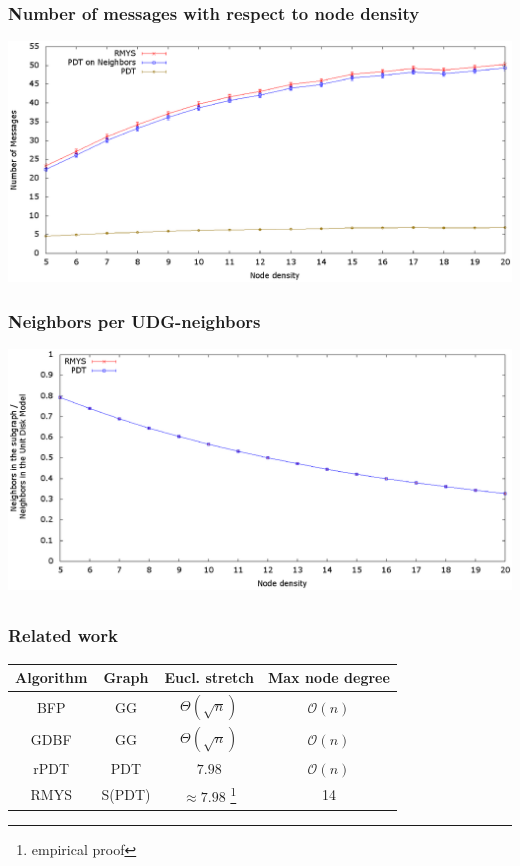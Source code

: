 \documentclass[compress]{beamer}
\begin{document}
\begin{frame} 
\frametitle{Number of messages with respect to node density}
\center	\includegraphics[width=1.0\linewidth]{RMYS_PDT_Neighbors.eps}
\end{frame}

\begin{frame} 
\frametitle{Neighbors per UDG-neighbors}
\center	\includegraphics[width=1.0\linewidth]{RMYS_PDT_UDGNeighborsRatio.eps}
\end{frame}

\subsection{}
\begin{frame}
\frametitle{Related work}
\begin{table}[h!]
\centering
\hspace*{-5mm}
\begin{tabular}{cccc}
\hline 
Algorithm & Graph & Eucl. stretch & Max node degree \\ 
\hline
BFP & GG & $\Theta{(\sqrt{n})} $ & $\mathcal{O}(n) $ \\ 

GDBF & GG & $\Theta{(\sqrt{n})} $ & $\mathcal{O}(n) $ \\ 

rPDT & PDT & $7.98 $ & $\mathcal{O}(n) $ \\ 

RMYS & S(PDT) & $\approx 7.98 $ \footnote{empirical proof} & 14 \\
\hline 
\end{tabular} 
\label{table:topologies}
\end{table}
\end{frame}
\end{document}
